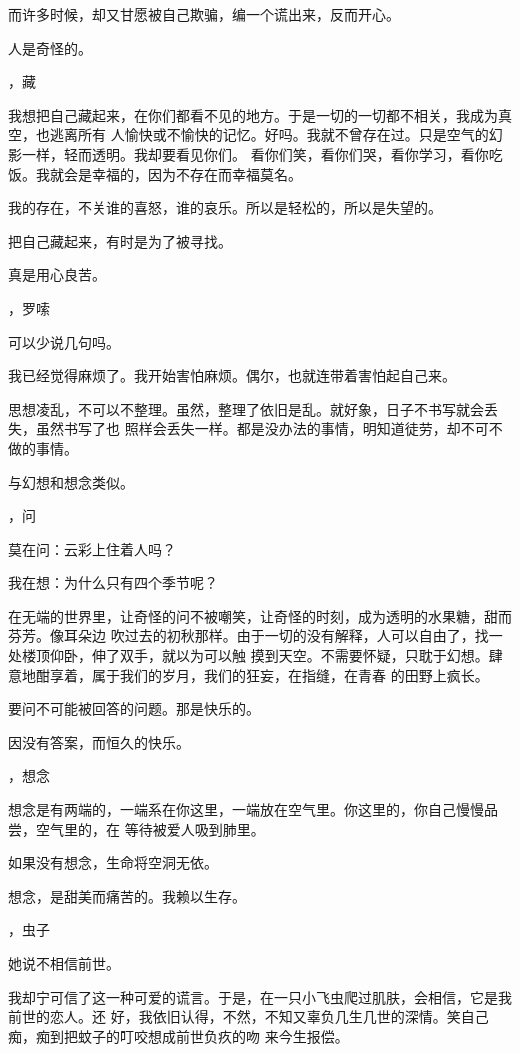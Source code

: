 \documentclass[12pt,a4paper]{article}
\def\blankrev{\vspace{1ex}}									%
\newcommand{\subpart}[1]{
	\begingroup \par
	\vspace{1ex} \centering #1
	\par \endgroup \nopagebreak[4]
}
\begin{document}
		而许多时候，却又甘愿被自己欺骗，编一个谎出来，反而开心。

		人是奇怪的。


		\subpart{7，藏}

		我想把自己藏起来，在你们都看不见的地方。于是一切的一切都不相关，我成为真空，也逃离所有
	人愉快或不愉快的记忆。好吗。我就不曾存在过。只是空气的幻影一样，轻而透明。我却要看见你们。
	看你们笑，看你们哭，看你学习，看你吃饭。我就会是幸福的，因为不存在而幸福莫名。

		我的存在，不关谁的喜怒，谁的哀乐。所以是轻松的，所以是失望的。

		把自己藏起来，有时是为了被寻找。

		真是用心良苦。


		\subpart{8，罗嗦}

		可以少说几句吗。

		我已经觉得麻烦了。我开始害怕麻烦。偶尔，也就连带着害怕起自己来。

		思想凌乱，不可以不整理。虽然，整理了依旧是乱。就好象，日子不书写就会丢失，虽然书写了也
	照样会丢失一样。都是没办法的事情，明知道徒劳，却不可不做的事情。

		与幻想和想念类似。

	\endwriting



	\subpart{1，问}

		莫在问：云彩上住着人吗？

		我在想：为什么只有四个季节呢？

		\blankrev
		在无端的世界里，让奇怪的问不被嘲笑，让奇怪的时刻，成为透明的水果糖，甜而芬芳。像耳朵边
	吹过去的初秋那样。由于一切的没有解释，人可以自由了，找一处楼顶仰卧，伸了双手，就以为可以触
	摸到天空。不需要怀疑，只耽于幻想。肆意地酣享着，属于我们的岁月，我们的狂妄，在指缝，在青春
	的田野上疯长。

		要问不可能被回答的问题。那是快乐的。

		因没有答案，而恒久的快乐。


	\subpart{2，想念}

		想念是有两端的，一端系在你这里，一端放在空气里。你这里的，你自己慢慢品尝，空气里的，在
	等待被爱人吸到肺里。

		如果没有想念，生命将空洞无依。

		想念，是甜美而痛苦的。我赖以生存。


	\subpart{3，虫子}

		她说不相信前世。

		我却宁可信了这一种可爱的谎言。于是，在一只小飞虫爬过肌肤，会相信，它是我前世的恋人。还
	好，我依旧认得，不然，不知又辜负几生几世的深情。笑自己痴，痴到把蚊子的叮咬想成前世负疚的吻
	来今生报偿。
\end{document}
